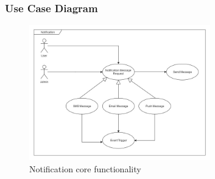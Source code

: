 \subsubsection{Use Case Diagram}

\begin{figure}[H]
	\centering
	\includegraphics[width=0.7\textwidth]{notification/img/NotificationUseCase.jpg}
	\caption{Notification core functionality }
\end{figure}
